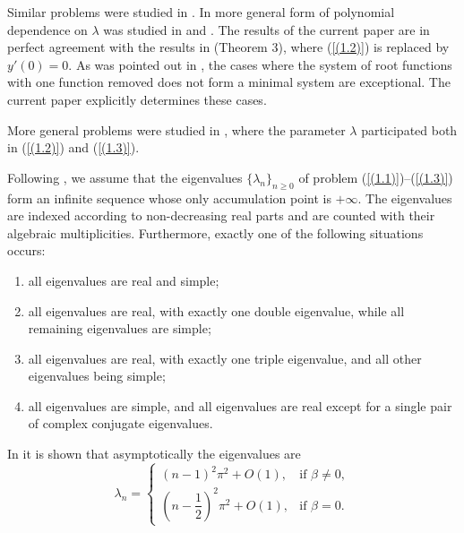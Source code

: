 \documentclass[10pt,a4paper]{amsart}
\numberwithin{equation}{section}
\begin{document}
Similar problems were  studied in \cite{fulton,kerimov1, aliyev1, aliyev2, zaliyev1,benedek, li, guliyev, kerimov, mois, maris, moller, olgar}. In more general form of polynomial dependence on $\lambda$ was studied in \cite{rus} and \cite{shkalikov1}. The results of the current paper are in perfect agreement with the results in \cite{shkalikov2} (Theorem 3), where (\ref{(1.2)}) is replaced by $y'(0)=0$. As was pointed out in \cite{shkalikov2}, the cases where the system of root functions with one function removed does not form a minimal system are exceptional. The current paper explicitly determines these cases.

More general problems were studied in \cite{shkalikov2,kerimov0}, where the parameter $\lambda$ participated both in (\ref{(1.2)}) and (\ref{(1.3)}).

Following \cite{binding1}, we assume that the eigenvalues
$\{\lambda_n\}_{n\ge0}$ of problem (\ref{(1.1)})--(\ref{(1.3)})
form an infinite sequence whose only accumulation point is $+\infty$.
The eigenvalues are indexed according to non-decreasing real parts and
are counted with their algebraic multiplicities. Furthermore, exactly
one of the following situations occurs:

\begin{enumerate}
\item[(i)] all eigenvalues are real and simple;

\item[(ii)] all eigenvalues are real, with exactly one double eigenvalue,
while all remaining eigenvalues are simple;

\item[(iii)] all eigenvalues are real, with exactly one triple
eigenvalue, and all other eigenvalues being simple;

\item[(iv)] all eigenvalues are simple, and all eigenvalues are real
except for a single pair of complex conjugate eigenvalues.
\end{enumerate}
In \cite[Theorem~2.2]{binding2} it is shown that asymptotically the eigenvalues are
\begin{equation}
\lambda_n =
\begin{cases}
\left(n-1\right)^2\pi^2 + O(1), & \text{if } \beta \neq 0,\\[6pt]
\left(n-\dfrac{1}{2}\right)^2\pi^2 + O(1), & \text{if } \beta = 0.
\end{cases}\label{(1.4)}
\end{equation}
\end{document}
